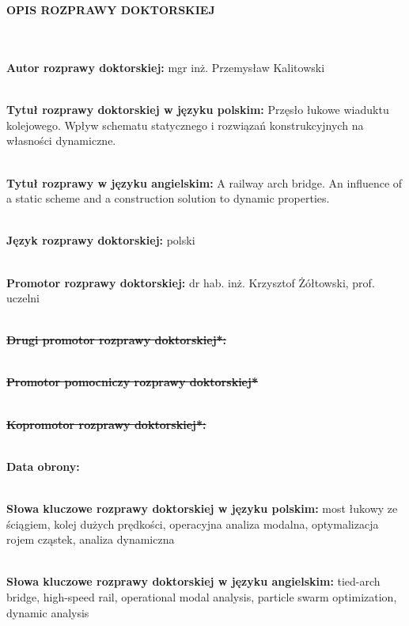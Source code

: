 \begin{figure}
	 \hfill
	
\end{figure}


\begin{myfont}
	\thispagestyle{plain}	
	\noindent
	\\ \\	
	\textbf{OPIS ROZPRAWY DOKTORSKIEJ}
	
	\footnotesize \noindent
	\\ \\
	\textbf{Autor rozprawy doktorskiej:} mgr inż. Przemysław Kalitowski
	
	\noindent
	\\
	\textbf{Tytuł rozprawy doktorskiej w języku polskim:} Przęsło łukowe wiaduktu kolejowego. Wpływ schematu statycznego i rozwiązań konstrukcyjnych na własności dynamiczne.
	
	\noindent
	\\
	\textbf{Tytuł rozprawy w języku angielskim:} A railway arch bridge. An influence of a static scheme and a construction solution to dynamic properties.
	
	\noindent
	\\
	\textbf{Język rozprawy doktorskiej:} polski
	
	\noindent
	\\
	\textbf{Promotor rozprawy doktorskiej:} dr hab. inż. Krzysztof Żółtowski, prof. uczelni
	
	\noindent
	\\
	{\bfseries \sout{Drugi promotor rozprawy doktorskiej*:}}
	
	\noindent
	\\
	{\bfseries \sout{Promotor pomocniczy rozprawy doktorskiej*}}
	
	\noindent
	\\
	{\bfseries \sout{Kopromotor rozprawy doktorskiej*:}}
	
	\noindent
	\\
	\textbf{Data obrony:}
	
	\noindent
	\\
	\textbf{Słowa kluczowe rozprawy doktorskiej w języku polskim:} most łukowy ze ściągiem, kolej dużych prędkości, operacyjna analiza modalna, optymalizacja rojem cząstek, analiza dynamiczna
	
	\noindent
	\\
	\textbf{Słowa kluczowe rozprawy doktorskiej w języku angielskim:} tied-arch bridge, high-speed rail, operational modal analysis, particle swarm optimization, dynamic analysis 
	\vfill
	

\end{myfont}
